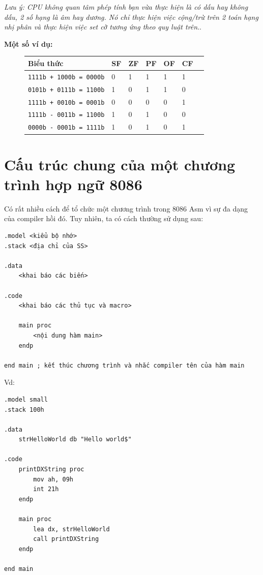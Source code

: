 \documentclass[12pt]{report}
\newcommand{\code}[1]{\texttt{#1}}
\begin{document}
\textit{Lưu ý: CPU không quan tâm phép tính bạn vừa thực hiện là có dấu hay không dấu, 2 số hạng là âm hay dương. Nó chỉ thực hiện việc cộng/trừ trên 2 toán hạng nhị phân và thực hiện việc set cờ tương ứng theo quy luật trên}.\cite{overflow_note}.

\textbf{Một số ví dụ:} 
\begin{figure}[H]
    \centering
    \begin{tabular}{|l|l|l|l|l|l|l|}
    \hline
    Biểu thức                    & SF & ZF & PF & OF & CF \\
    \hline
    \code{1111b + 1000b = 0000b} & 0  & 1  & 1  & 1  & 1 \\
    \code{0101b + 0111b = 1100b} & 1  & 0  & 1  & 1  & 0 \\
    \code{1111b + 0010b = 0001b} & 0  & 0  & 0  & 0  & 1 \\
    \code{1111b - 0011b = 1100b} & 1  & 0  & 1  & 0  & 0 \\
    \code{0000b - 0001b = 1111b} & 1  & 0  & 1  & 0  & 1 \\
    \hline
    \end{tabular}
\end{figure}


\section{Cấu trúc chung của một chương trình hợp ngữ 8086}
Có rất nhiều cách để tổ chức một chương trình trong 8086 Asm vì sự đa dạng của compiler hồi đó. Tuy nhiên, ta có cách thường sử dụng sau:

\begin{verbatim}
.model <kiểu bộ nhớ>
.stack <địa chỉ của SS>

.data
    <khai báo các biến>

.code 
    <khai báo các thủ tục và macro>

    main proc 
        <nội dung hàm main>
    endp

end main ; kết thúc chương trình và nhắc compiler tên của hàm main
\end{verbatim}
Vd: 
\begin{verbatim}
.model small
.stack 100h

.data
    strHelloWorld db "Hello world$"

.code 
    printDXString proc 
        mov ah, 09h
        int 21h
    endp

    main proc 
        lea dx, strHelloWorld
        call printDXString
    endp

end main 
\end{verbatim}
\end{document}
